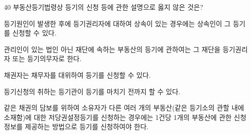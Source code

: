 \begin{question}{40}
부동산등기법령상 등기의 신청 등에 관한 설명으로 옳지 않은 것은?
\begin{choices}
  \item 등기원인이 발생한 후에 등기권리자에 대하여 상속이 있는 경우에는 상속인이 그 등기를 신청할 수 있다.
  \item 관리인이 있는 법인 아닌 재단에 속하는 부동산의 등기에 관하여는 그 재단을 등기권리자 또는 등기의무자로 한다.
  \item 채권자는 채무자를 대위하여 등기를 신청할 수 있다.
  \item 등기신청의 취하는 등기관이 등기를 마치기 전까지 할 수 있다.
  \item 같은 채권의 담보를 위하여 소유자가 다른 여러 개의 부동산(같은 등기소의 관할 내에 소재함)에 대한 저당권설정등기를 신청하는 경우에는 1건당 1개의 부동산에 관한 신청정보를 제공하는 방법으로 등기를 신청하여야 한다.
\end{choices}
\end{question}
